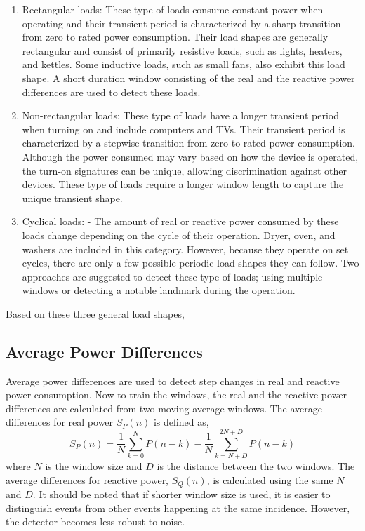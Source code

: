 \documentclass[conference]{IEEEtran}
\begin{document}
\begin{enumerate}
\item{Rectangular loads:} These type of loads consume constant power when operating and their transient period is characterized by a sharp transition from zero to rated power consumption.  Their load shapes are generally rectangular and consist of primarily resistive loads, such as lights, heaters, and kettles.  Some inductive loads, such as small fans, also exhibit this load shape.  A short duration window consisting of the real and the reactive power differences are used to detect these loads.
\newline
\item{Non-rectangular loads:} These type of loads have a longer transient period when turning on and include computers and TVs.  Their transient period is characterized by a stepwise transition from zero to rated power consumption.  Although the power consumed may vary based on how the device is operated, the turn-on signatures can be unique, allowing discrimination against other devices.  These type of loads require a longer window length to capture the unique transient shape.
\newline
\item{Cyclical loads:} - The amount of real or reactive power consumed by these loads change depending on the cycle of their operation.  Dryer, oven, and washers are included in this category.   However, because they operate on set cycles, there are only a few possible periodic load shapes they can follow.  Two approaches are suggested to detect these type of loads; using multiple windows or detecting a notable landmark during the operation.
\end{enumerate}
Based on these three general load shapes, 

\subsection{Average Power Differences}
Average power differences are used to detect step changes in real and reactive power consumption. Now to train the windows, the real and the reactive power differences are calculated from two moving average windows.  The average differences for real power $S_{P}(n)$ is defined as,
\begin{equation}
S_{P}(n) = \frac{1}{N}\sum_{k=0}^{N}P(n-k) - \frac{1}{N}\sum_{k=N+D}^{2N+D}P(n-k)
\end{equation}
where $N$ is the window size and $D$ is the distance between the two windows.  The average differences for reactive power, $S_{Q}(n)$, is calculated using the same $N$ and $D$.  It should be noted that if shorter window size is used, it is easier to distinguish events from other events happening at the same incidence.  However, the detector becomes less robust to noise.
\end{document}
